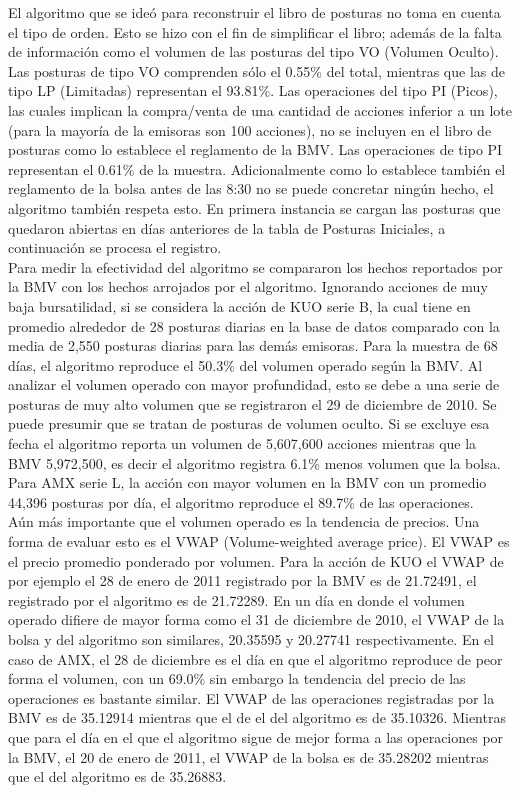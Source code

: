 \documentclass[10pt]{article}
\begin{document}
El algoritmo que se ideó para reconstruir el libro de posturas no toma en cuenta el tipo de orden. Esto se hizo con el fin de simplificar el libro; además de la falta de información como el volumen de las posturas del tipo VO (Volumen Oculto). Las posturas de tipo VO comprenden sólo el 0.55\% del total, mientras que las de tipo LP (Limitadas) representan el 93.81\%. Las operaciones del tipo PI (Picos), las cuales implican la compra/venta de una cantidad de acciones inferior a un lote (para la mayoría de la emisoras son 100 acciones), no se incluyen en el libro de posturas como lo establece el reglamento de la BMV. Las operaciones de tipo PI representan el 0.61\% de la muestra. Adicionalmente como lo establece también el reglamento de la bolsa antes de las 8:30 no se puede concretar ningún hecho, el algoritmo también respeta esto. En primera instancia se cargan las posturas que quedaron abiertas en días anteriores de la tabla de Posturas Iniciales, a continuación se procesa el registro.\\

Para medir la efectividad del algoritmo se compararon los hechos reportados por la BMV con los hechos arrojados por el algoritmo.
Ignorando acciones de muy baja bursatilidad, si se considera la acción de KUO serie B, la cual tiene en promedio alrededor de 28 posturas diarias en la base de datos comparado con la media de 2,550 posturas diarias para las demás emisoras. Para la muestra de 68 días, el algoritmo reproduce el 50.3\% del volumen operado según la BMV. Al analizar el volumen operado con mayor profundidad, esto se debe a una serie de posturas de muy alto volumen que se registraron el 29 de diciembre de 2010. Se puede presumir que se tratan de posturas de volumen oculto. Si se excluye esa fecha el algoritmo reporta un volumen de 5,607,600 acciones mientras que la BMV 5,972,500, es decir el algoritmo registra 6.1\% menos volumen que la bolsa. Para AMX serie L, la acción con mayor volumen en la BMV con un promedio 44,396 posturas por día, el algoritmo reproduce el 89.7\% de las operaciones.\\

Aún más importante que el volumen operado es la tendencia de precios. Una forma de evaluar esto es el VWAP (Volume-weighted average price). El VWAP es el precio promedio ponderado por volumen. Para la acción de KUO el VWAP de por ejemplo el 28 de enero de 2011 registrado por la BMV es de 21.72491, el registrado por el algoritmo es de 21.72289. En un día en donde el volumen operado difiere de mayor forma como el 31 de diciembre de 2010, el VWAP de la bolsa y del algoritmo son similares, 20.35595 y 20.27741 respectivamente. En el caso de AMX, el 28 de diciembre es el día en que el algoritmo reproduce de peor forma el volumen, con un 69.0\% sin embargo la tendencia del precio de las operaciones es bastante similar. El VWAP de las operaciones registradas por la BMV es de 35.12914 mientras que el de el del algoritmo es de 35.10326. Mientras que para el día en el que el algoritmo sigue de mejor forma a las operaciones por la BMV, el 20 de enero de 2011, el VWAP de la bolsa es de 35.28202 mientras que el del algoritmo es de 35.26883.
\end{document}
